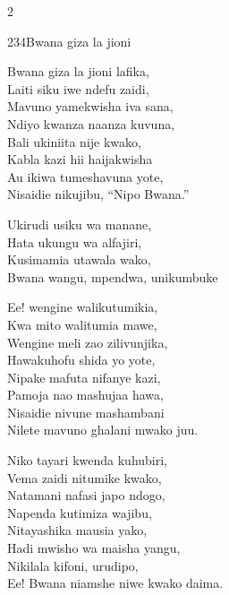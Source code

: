 \begin{multicols}{2}
\begin{hymn}{234}{Bwana giza la jioni}{}
\begin{stanza}
Bwana giza la jioni lafika,\\
Laiti siku iwe ndefu zaidi,\\
Mavuno yamekwisha iva sana,\\
Ndiyo kwanza naanza kuvuna,\\
Bali ukiniita nije kwako,\\
Kabla kazi hii haijakwisha\\
Au ikiwa tumeshavuna yote,\\
Nisaidie nikujibu, ``Nipo Bwana.''
\end{stanza}
\begin{chorus}
Ukirudi usiku wa manane,\\
Hata ukungu wa alfajiri,\\
Kusimamia utawala wako,\\
Bwana wangu, mpendwa, unikumbuke
\end{chorus}
\begin{stanza}
Ee! wengine walikutumikia,\\
Kwa mito walitumia mawe,\\
Wengine meli zao zilivunjika,\\
Hawakuhofu shida yo yote,\\
Nipake mafuta nifanye kazi,\\
Pamoja nao mashujaa hawa,\\
Nisaidie nivune mashambani\\
Nilete mavuno ghalani mwako juu.
\end{stanza}
\begin{stanza}
Niko tayari kwenda kuhubiri,\\
Vema zaidi nitumike kwako,\\
Natamani nafasi japo ndogo,\\
Napenda kutimiza wajibu,\\
Nitayashika mausia yako,\\
Hadi mwisho wa maisha yangu,\\
Nikilala kifoni, urudipo,\\
Ee! Bwana niamshe niwe kwako daima.
\end{stanza}
\end{hymn}


\end{multicols}
